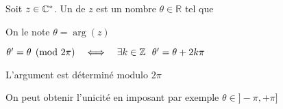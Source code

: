 \begin{frame}

Soit $z \in \mathbb{C}^*$. Un  de $z$ est un nombre $\theta\in\mathbb{R}$ tel que 

\pause

\vspace*{-2ex}
{
\hfill
\begin{minipage}{0.4\linewidth}
On le note $\theta = \arg(z)$
\end{minipage}
\hfill
\pause
\begin{minipage}{0.5\linewidth}
\end{minipage}
\hfill\hfill
}
\pause
\begin{remarque}

\centerline{$\theta' = \theta \pmod {2\pi} \quad  \Longleftrightarrow \quad  \exists k \in
     \mathbb{Z} \ \  \theta' = \theta + 2 k \pi$ }

\pause
\medskip

L'argument est déterminé modulo $2\pi$





\pause
\medskip

On peut obtenir l'unicité en imposant par exemple $\theta\in]-\pi,+\pi]$
\end{remarque}

\end{frame}



